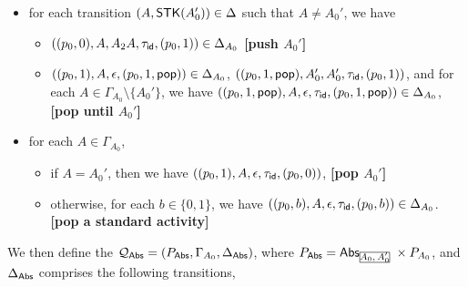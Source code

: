 {\begin{itemize}
\begin{itemize}
            \item $((p_0,b), A, BA, \tau_{B, \dag}, (p_0,b)) \in \Delta_{A_0}$ \textbf{[escalate $B$ to be the top]}
        \end{itemize}
    \item for each transition $(A,\mathsf{STK}(A_0'))\in\Delta$ such that $A\neq A_0'$, we have 
        \begin{itemize}
            \item $((p_0,0),A,A_2A,\tau_{\mathsf{id}},(p_0,1))\in\Delta_{A_0}$ \textbf{[push $A_0'$]}
            \item $((p_0,1),A,\epsilon,(p_0,1,\mathsf{pop}))\in\Delta_{A_0}$, $((p_0,1,\mathsf{pop}),A_0',A_0',\tau_{\mathsf{id}},(p_0,1))$, and for each $A\in\Gamma_{A_0}\setminus\{A_0'\}$, we have $((p_0,1,\mathsf{pop}),A,\epsilon,\tau_{\mathsf{id}},(p_0,1,\mathsf{pop}))\in\Delta_{A_0}$, \textbf{[pop until $A_0'$]}
        \end{itemize}
    \item for each $A\in\Gamma_{A_0}$, 
        \begin{itemize}
            \item if $A=A_0'$, then we have $((p_0,1),A,\epsilon,\tau_{\mathsf{id}},(p_0,0))$, \textbf{[pop $A_0'$]}
            \item otherwise, for each $b\in\{0,1\}$, we have $((p_0,b),A,\epsilon,\tau_{\mathsf{id}},(p_0,b))\in\Delta_{A_0}$. \textbf{[pop a standard activity]}
        \end{itemize}
\end{itemize}
}
We then define the {\WOTrPDS} ${\mathcal{Q} }_{{\mathsf{Abs} }} = (P_{{\mathsf{Abs} }},\Gamma_{A_0},\Delta_{{\mathsf{Abs} }})$, where $P_{\abs} = \abs_{\mhcancel{A_0,A_0'}}\times P_{A_0}$, and $\Delta_{{\mathsf{Abs} }}$ comprises the following transitions,
